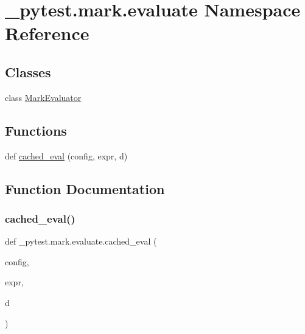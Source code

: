 \hypertarget{namespace__pytest_1_1mark_1_1evaluate}{}\section{\+\_\+pytest.\+mark.\+evaluate Namespace Reference}
\label{namespace__pytest_1_1mark_1_1evaluate}
\subsection*{Classes}
\begin{DoxyCompactItemize}
\item 
class \hyperlink{class__pytest_1_1mark_1_1evaluate_1_1_mark_evaluator}{Mark\+Evaluator}
\end{DoxyCompactItemize}
\subsection*{Functions}
\begin{DoxyCompactItemize}
\item 
def \hyperlink{namespace__pytest_1_1mark_1_1evaluate_af7f40b156b76117087461a7cee41588c}{cached\+\_\+eval} (config, expr, d)
\end{DoxyCompactItemize}


\subsection{Function Documentation}
\mbox{\label{namespace__pytest_1_1mark_1_1evaluate_af7f40b156b76117087461a7cee41588c}} 
\subsubsection{\texorpdfstring{cached\+\_\+eval()}{cached\_eval()}}
{\footnotesize\ttfamily def \+\_\+pytest.\+mark.\+evaluate.\+cached\+\_\+eval (\begin{DoxyParamCaption}\item[{}]{config,  }\item[{}]{expr,  }\item[{}]{d }\end{DoxyParamCaption})}


